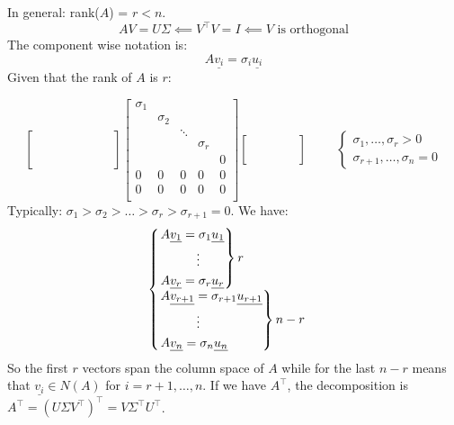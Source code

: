 In general: rank($A$) = $r < n$.
\[
    AV = U\Sigma \impliedby V^\intercal V = I \impliedby V \text{ is orthogonal}    
\]
The component wise notation is:
\[
    A\underline{v_i} = \sigma_i\underline{u_i}    
\]
Given that the rank of $A$ is $r$:

\[
\begin{bmatrix}
    & & & & & & &\\
    & & & & & & &\\
    & & & & & & &\\
    & & & & & & &\\
    & & & & & & &\\
    & & & & & & &\\
\end{bmatrix}
\begin{bmatrix}
    \sigma_1 & & & &\\
    & \sigma_2 & & &\\
    & & \ddots & &\\
    & & & \sigma_r &\\
    & & & & 0\\
    \hline
    0 & 0 & 0 & 0 & 0\\
    0 & 0 & 0 & 0 & 0\\
\end{bmatrix}
\begin{bmatrix}
    & & & & \\
    & & & & \\
    & & & & \\
    & & & & \\
\end{bmatrix}
\hspace{1cm}
\begin{cases}
\sigma_1, \dots, \sigma_r > 0\\
\sigma_{r+1}, \dots, \sigma_n = 0
\end{cases}  
\]
Typically: $\sigma_1 > \sigma_2 > \dots > \sigma_r > \sigma_{r+1} = 0$.
We have:
\[
\begin{cases}
    \begin{rcases}
        A\underline{v_1} = \sigma_1\underline{u_1}\\
        \hspace{1cm}\vdots\\
        A\underline{v_r} = \sigma_r\underline{u_r}\\        
    \end{rcases} r\\
    \begin{rcases}
        A\underline{v_{r+1}} = \sigma_{r+1}\underline{u_{r+1}}\\
        \hspace{1cm}\vdots\\
        A\underline{v_n} = \sigma_n\underline{u_n}\\        
    \end{rcases} n-r
\end{cases}    
\]
So the first $r$ vectors span the column space of $A$ while for the last $n-r$ means that $\underline{v_i} \in N(A)$ for $i = r+1, \dots, n$.
If we have $A^\intercal$, the decomposition is $A^\intercal = (U\Sigma V^\intercal)^\intercal = V\Sigma^\intercal U^\intercal$. 

